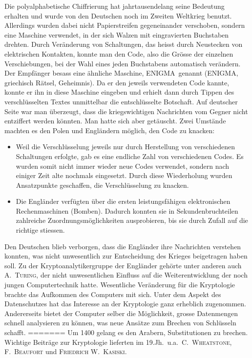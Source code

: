 \documentclass[%
<<<<<<< Updated upstream
11pt,%
twoside,%
titlepage,%
german,%
headsepline%
]{scrartcl}
\begin{document}
Die polyalphabetische Chiffrierung hat jahrtausendelang seine Bedeutung erhalten und wurde von den Deutschen noch im Zweiten Weltkrieg benutzt. Allerdings wurden dabei nicht Papierstreifen gegeneinander verschoben, sondern eine Maschine verwendet, in der sich Walzen mit eingravierten Buchstaben drehten. Durch Veränderung von Schaltungen, das heisst durch Neustecken von elektrischen Kontakten, konnte man den Code, also die Gr\"osse der einzelnen Verschiebungen, bei der Wahl eines jeden Buchstabens automatisch verändern. Der Empfänger besass eine ähnliche Maschine, \glqq ENIGMA\grqq\ genannt (ENIGMA, griechisch Rätsel, Geheimnis). Da er den jeweils verwendeten Code kannte, konnte er ihn in diese Maschine eingeben und erhielt dann durch Tippen des verschlüsselten Textes unmittelbar die entschlüsselte Botschaft. Auf deutscher Seite war man überzeugt, dass die kriegswichtigen Nachrichten vom Gegner nicht entziffert werden könnten. Man hatte sich aber getäuscht. Zwei Umstände machten es den Polen und Engländern möglich, den Code zu knacken:
\begin{itemize}
\item Weil die Verschlüsselung jeweils nur durch Herstellung von verschiedenen Schaltungen erfolgte, gab es eine endliche Zahl von verschiedenen Codes. Es wurden somit nicht immer wieder neue Codes verwendet, sondern nach einiger Zeit alte nochmals eingesetzt. Durch diese Wiederholung wurden Ansatzpunkte geschaffen, die Verschlüsselung zu knacken.
\item Die Engländer verfügten über die ersten leistungsfähigen elektronischen	Rechenmaschinen (Bomben). Dadurch konnten sie in Sekundenbruchteilen zahlreiche Zu\-ord\-nungs\-m\"og\-lich\-kei\-ten ausprobieren, bis sie durch Zufall auf die richtige stiessen.
\end{itemize}
Den Deutschen blieb verborgen, dass die Engländer ihre Nachrichten verstehen konnten, was nicht unwesentlich zur Entscheidung des Krieges beigetragen haben soll. Zu der Kryptoanalytikergruppe der Engländer geh\"orte unter anderen auch \textsc{A.~Turing}, der nicht unwesentlichen Einfluss auf die Weiterentwicklung der noch jungen Computertechnik hatte. Wesentliche Veränderung für die Kryptologie brachte das Aufkommen des Computers mit sich. Unter dem Aspekt des Datenschutzes hat das Interesse an der Kryptologie ganz erheblich zugenommen. Andererseits bietet der Computer selber die Möglichkeit, grosse Datenmengen schnell analysieren zu k\"onnen, was neue Ansätze zum Brechen von Schlüsseln schafft.
=======
Um 1400 gelang es den Arabern, Substitutionen zu brechen. Wichtige Beiträge zur Kryptologie lieferten im 19.Jh.~u.a.~\textsc{C.~Wheatstone, F.~Beaufort} und \textsc{Friedrich W.~Kasiski}.
\end{document}
